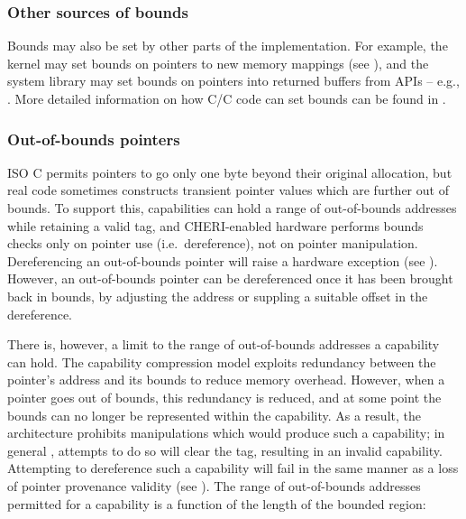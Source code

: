 \documentclass[12pt,twoside,openright,usletter]{article}
\newcommand{\ccode}[1]{{\small\ttfamily{#1}}}
\newcommand{\cfunc}[1]{{\ccode{#1()}}}
\newcommand{\note}[2]{{\color{blue}[ Note: #1 - #2]}}
\renewcommand{\note}[2]{\relax\ifhmode\unskip\fi}
\newcommand{\arnote}[1]{\note{#1}{Alex R.}}
\newcommand{\psnote}[1]{\note{#1}{Peter S.}}
\newcommand*{\cpp}[1][]{C\textsmaller[2]{\nolinebreak[4]\hspace{-.05em}\raisebox{.45ex}{\textbf{++}}}}
\begin{document}
\psnote{that seems excessively bold to me}
\psnote{what flag?}
\psnote{curious: what has to change before you think it'd be a good default?}


\subsubsection{Other sources of bounds}

Bounds may also be set by other parts of the implementation.
For example, the kernel may set bounds on pointers to new memory mappings (see
), and the system library may set bounds on pointers
into returned buffers from APIs -- e.g., \cfunc{fgetln}.
More detailed information on how C/\cpp{} code can set bounds can be found in
.

\subsubsection{Out-of-bounds pointers}
\label{sec:oob}

\note{I feel like this section wants a reference to CHERI Concentrate?}{nwf}

ISO C permits pointers to go only one byte beyond their original
allocation, but real code sometimes constructs transient pointer
values which are further out of bounds.  To support this, capabilities
can hold a range of out-of-bounds addresses while retaining a valid
tag, and CHERI-enabled hardware performs bounds checks only on pointer
use (i.e.\ dereference), not on pointer manipulation.  Dereferencing
an out-of-bounds pointer will raise a hardware exception (see
).  However, an out-of-bounds pointer can be
dereferenced once it has been brought back in bounds, by adjusting the
address or suppling a suitable offset in the dereference.

There is, however, a limit to the range of out-of-bounds addresses a capability can hold.
The capability compression model exploits redundancy between the pointer's address and
its bounds to reduce memory overhead.
However, when a pointer goes out of bounds, this redundancy is reduced, and at
some point the bounds can no longer be represented within the capability.
As a result, the architecture prohibits manipulations which would produce such
a capability; in general%
\psnote{slightly mysterious ``in general'' -- isn't this always true?}%
\arnote{I think the intent of this wording was to allow for trapping behaviour?}%
, attempts to do so will clear the tag, resulting in
an invalid capability.
Attempting to dereference such a capability will fail in the same
manner as a loss of pointer provenance validity (see
).
\psnote{Comment on whether that should immediately trap instead?}
The range of out-of-bounds addresses permitted for a capability is
a function of the length of the bounded region:
\end{document}
